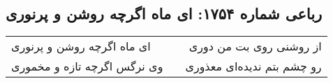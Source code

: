 \begin{center}
\section*{رباعی شماره ۱۷۵۴: ای ماه اگرچه روشن و پرنوری}
\label{sec:1754}
\begin{longtable}{l p{0.5cm} r}
ای ماه اگرچه روشن و پرنوری
&&
از روشنی روی بت من دوری
\\
وی نرگس اگرچه تازه و مخموری
&&
رو چشم بتم ندیده‌ای معذوری
\\
\end{longtable}
\end{center}
